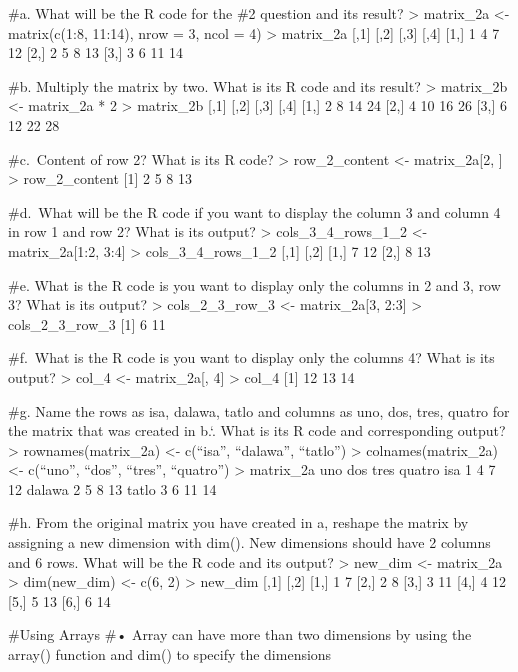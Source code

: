 \documentclass[
]{article}
\begin{document}
\#a. What will be the R code for the \#2 question and its result?
\textgreater{} matrix\_2a \textless- matrix(c(1:8, 11:14), nrow = 3,
ncol = 4) \textgreater{} matrix\_2a {[},1{]} {[},2{]} {[},3{]} {[},4{]}
{[}1,{]} 1 4 7 12 {[}2,{]} 2 5 8 13 {[}3,{]} 3 6 11 14

\#b. Multiply the matrix by two. What is its R code and its result?
\textgreater{} matrix\_2b \textless- matrix\_2a * 2 \textgreater{}
matrix\_2b {[},1{]} {[},2{]} {[},3{]} {[},4{]} {[}1,{]} 2 8 14 24
{[}2,{]} 4 10 16 26 {[}3,{]} 6 12 22 28

\#c.~Content of row 2? What is its R code? \textgreater{}
row\_2\_content \textless- matrix\_2a{[}2, {]} \textgreater{}
row\_2\_content {[}1{]} 2 5 8 13

\#d.~What will be the R code if you want to display the column 3 and
column 4 in row 1 and row 2? What is its output? \textgreater{}
cols\_3\_4\_rows\_1\_2 \textless- matrix\_2a{[}1:2, 3:4{]}
\textgreater{} cols\_3\_4\_rows\_1\_2 {[},1{]} {[},2{]} {[}1,{]} 7 12
{[}2,{]} 8 13

\#e. What is the R code is you want to display only the columns in 2 and
3, row 3? What is its output? \textgreater{} cols\_2\_3\_row\_3
\textless- matrix\_2a{[}3, 2:3{]} \textgreater{} cols\_2\_3\_row\_3
{[}1{]} 6 11

\#f.~What is the R code is you want to display only the columns 4? What
is its output? \textgreater{} col\_4 \textless- matrix\_2a{[}, 4{]}
\textgreater{} col\_4 {[}1{]} 12 13 14

\#g. Name the rows as isa, dalawa, tatlo and columns as uno, dos, tres,
quatro for the matrix that was created in b.`. What is its R code and
corresponding output? \textgreater{} rownames(matrix\_2a) \textless-
c(``isa'', ``dalawa'', ``tatlo'') \textgreater{} colnames(matrix\_2a)
\textless- c(``uno'', ``dos'', ``tres'', ``quatro'') \textgreater{}
matrix\_2a uno dos tres quatro isa 1 4 7 12 dalawa 2 5 8 13 tatlo 3 6 11
14

\#h. From the original matrix you have created in a, reshape the matrix
by assigning a new dimension with dim(). New dimensions should have 2
columns and 6 rows. What will be the R code and its output?
\textgreater{} new\_dim \textless- matrix\_2a \textgreater{}
dim(new\_dim) \textless- c(6, 2) \textgreater{} new\_dim {[},1{]}
{[},2{]} {[}1,{]} 1 7 {[}2,{]} 2 8 {[}3,{]} 3 11 {[}4,{]} 4 12 {[}5,{]}
5 13 {[}6,{]} 6 14

\#Using Arrays \#• Array can have more than two dimensions by using the
array() function and dim() to specify the dimensions
\end{document}
